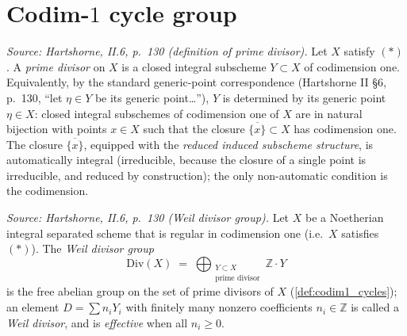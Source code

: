 \section{Codim-\(1\) cycle group}
\begin{definition}
  \label{def:prime_divisor}
  \textit{Source: Hartshorne, II.6, p.~130 (definition of prime divisor).}
  Let \(X\) satisfy \((*)\). A \emph{prime divisor} on \(X\) is a closed integral
  subscheme \(Y \subset X\) of codimension one. Equivalently, by the standard
  generic-point correspondence (Hartshorne II \S6, p.~130, ``let $\eta \in
  Y$ be its generic point\ldots''), $Y$ is determined by its generic point
  \(\eta \in X\): closed integral subschemes of codimension one of \(X\) are in
  natural bijection with points \(x \in X\) such that the closure
  \(\overline{\{x\}} \subset X\) has codimension one. The closure
  \(\overline{\{x\}}\), equipped with the \emph{reduced induced subscheme
  structure}, is automatically integral (irreducible, because the closure
  of a single point is irreducible, and reduced by construction); the only
  non-automatic condition is the codimension.
\end{definition}
\begin{definition}
  \label{def:codim1_cycles}
  
  \textit{Source: Hartshorne, II.6, p.~130 (Weil divisor group).}
  Let \(X\) be a Noetherian integral separated scheme that is regular in
  codimension one (i.e.\ \(X\) satisfies \((*)\)). The \emph{Weil divisor group}
  \[
    \mathrm{Div}(X) \;=\; \bigoplus_{\substack{Y \subset X \\ \text{prime divisor}}}
    \mathbb Z \cdot Y
  \]
  is the free abelian group on the set of prime divisors of \(X\)
  (\ref{def:codim1_cycles}); an element \(D = \sum n_i Y_i\) with finitely
  many nonzero coefficients \(n_i \in \mathbb Z\) is called a \emph{Weil
  divisor}, and is \emph{effective} when all \(n_i \geq 0\).
\end{definition}
